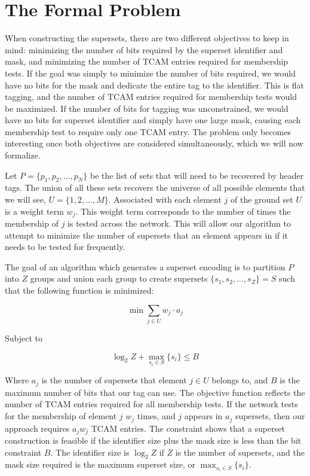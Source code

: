 

\section{The Formal Problem}
When constructing the supersets, there are two different objectives to keep in mind: minimizing the number of bits required by the superset identifier and mask, and minimizing the number of TCAM entries required for membership tests. If the goal was simply to minimize the number of bits required, we would have no bits for the mask and dedicate the entire tag to the identifier. This is flat tagging, and the number of TCAM entries required for membership tests would be maximized. If the number of bits for tagging was unconstrained, we would have no bits for superset identifier and simply have one large mask, causing each membership test to require only one TCAM entry. The problem only becomes interesting once both objectives are considered simultaneously, which we will now formalize. 

Let $P = \{p_1, p_2, \dots, p_N \}$ be the list of sets that will need to be recovered by header tags. The union of all these sets recovers the universe of all possible elements that we will see, $U =
\{1, 2, \dots, M\}$. Associated with
each element $j$ of the ground set $U$ is a weight term $w_j$. This weight term corresponds to the number of times the membership of $j$ is tested across the network. This will allow our algorithm to attempt to minimize the number of supersets that an element appears in if it needs to be tested for frequently. 

The goal of an algorithm which generates a superset encoding is to partition $P$ into $Z$ groups and union each group to create supersets $\{
s_1, s_2, \dots, s_Z \} = S$ such that the following function is minimized:

\begin{samepage}
$$ \min \sum_{j \in U} w_j \cdot a_j $$

Subject to

$$ \log_2{Z} + \max_{s_i \in S}\{s_i\} \le B $$

\end{samepage}

Where $a_j$ is the number of supersets that element $j \in U$ belongs to, and $B$ is the maximum number of bits that our tag can use. The objective function reflects the number of TCAM entries required for all membership tests. If the network tests for the membership of element $j$ $w_j$ times, and $j$ appears in $a_j$ supersets, then our approach requires $a_j w_j$ TCAM entries. 
The constraint shows that a superset construction is feasible if the identifier size plus the mask size is less than the bit constraint $B$. The identifier size is $\log_2{Z}$ if $Z$ is the number of supersets, and the mask size required is the maximum superset size, or $\max_{s_i \in S}\{s_i\}$.


